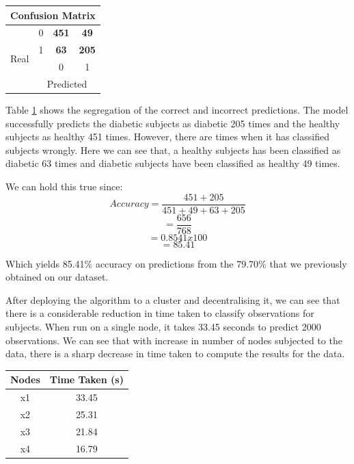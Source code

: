 \documentclass[12pt]{article}
\begin{document}
\begin{table}[ht]
\centering
\begin{tabular}{|c|c|c|c|}
\hline
\multicolumn{4}{|c|}{Confusion Matrix}                  \\ \hline
\multirow{4}{*}{Real} & 0 & \textbf{451} & \textbf{49}  \\ \cline{2-4} 
                      & 1 & \textbf{63}  & \textbf{205} \\ \cline{2-4} 
                      &   & 0            & 1            \\ \cline{2-4} 
                      & \multicolumn{3}{c|}{Predicted}  \\ \hline
\end{tabular}
\label{table:14}
\end{table}


Table \ref{table:14} shows the segregation of the correct and incorrect predictions. The model successfully  predicts the diabetic subjects as diabetic 205 times and the healthy subjects as healthy 451 times. However, there are times when it has classified subjects wrongly. Here we can see that, a healthy subjects has been classified as diabetic 63 times and diabetic subjects have been classified as healthy 49 times.

We can hold this true since:
$$Accuracy = \dfrac{451+205}{451+49+63+205}$$
$$=\dfrac{656}{768}$$
$$=0.8541x100$$
$$=85.41$$


Which yields 85.41\% accuracy on predictions from the 79.70\% that we previously obtained on our dataset.

After deploying the algorithm to a cluster and decentralising it, we can see that there is a considerable reduction in time taken to classify observations for subjects. When run on a single node, it takes 33.45 seconds to predict 2000 observations. We can see that with increase in number of nodes subjected to the data, there is a sharp decrease in time taken to compute the results for the data.

\begin{table}[ht]
\centering
\begin{tabular}{|c|c|}
\hline
Nodes & Time Taken (s) \\\hline
x1    & 33.45          \\\hline
x2    & 25.31          \\\hline
x3    & 21.84          \\\hline
x4    & 16.79          \\\hline
\end{tabular}
\label{table:13}
\end{table}
\end{document}
